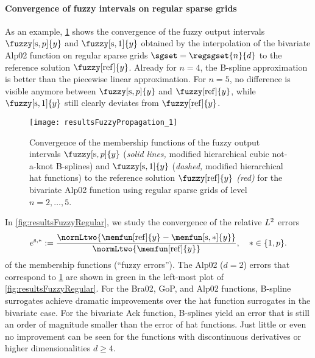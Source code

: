 \paragraph{Convergence of fuzzy intervals on regular sparse grids}

As an example,
\cref{fig:resultsFuzzyPropagation} shows the convergence of the
fuzzy output intervals $\fuzzy[\sparse,p]{y}$ and $\fuzzy[\sparse,1]{y}$
obtained by the interpolation of the
bivariate Alp02 function on regular sparse grids $\sgset = \regsgset{n}{d}$
to the reference solution $\fuzzy[\reference]{y}$.
Already for $n = 4$, the B-spline approximation is better than the
piecewise linear approximation.
For $n = 5$, no difference is visible anymore between $\fuzzy[\sparse,p]{y}$
and $\fuzzy[\reference]{y}$, while $\fuzzy[\sparse,1]{y}$ still clearly
deviates from $\fuzzy[\reference]{y}$.

\begin{SCfigure}
  \texttt{[image: resultsFuzzyPropagation\_1]}%
  \caption[Convergence of fuzzy output intervals]{%
    Convergence of the membership functions of the fuzzy output intervals
    $\fuzzy[\sparse,p]{y}$
    (\emph{solid lines,} modified hierarchical cubic not-a-knot B-splines)
    and $\fuzzy[\sparse,1]{y}$
    (\emph{dashed,} modified hierarchical hat functions)
    to the reference solution $\fuzzy[\reference]{y}$
    \emph{\textcolor{C1}{(red)}} for the bivariate Alp02 function using
    regular sparse grids of level $n = 2, \dotsc, 5$.%
  }%
  \label{fig:resultsFuzzyPropagation}%
\end{SCfigure}

In \cref{fig:resultsFuzzyRegular}, we study the convergence of the
relative $L^2$ errors
\begin{equation}
  e^{\sparse,\ast}
  := \frac{
    \normLtwo{\memfun[\reference]{y} - \memfun[\sparse,\ast]{y}}
  }{
    \normLtwo{\memfun[\reference]{y}}
  },\quad
  \ast \in \{1, p\}.
\end{equation}
of the membership functions (``fuzzy errors'').
The Alp02 ($d = 2$) errors
that correspond to \cref{fig:resultsFuzzyPropagation}
are shown in green in the left-most plot of \cref{fig:resultsFuzzyRegular}.
For the Bra02, GoP, and Alp02 functions, B-spline surrogates achieve
dramatic improvements over the hat function surrogates in the bivariate case.
For the bivariate Ack function, B-splines yield an error that
is still an order of magnitude smaller than the error of hat functions.
Just little or even no improvement can be seen
for the functions with discontinuous derivatives or
higher dimensionalities $d \ge 4$.

